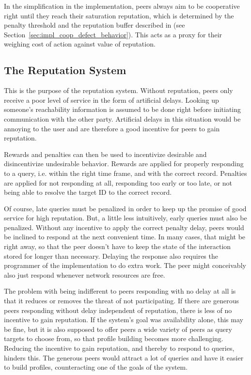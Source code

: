 In the simplification in the implementation, peers always aim to be cooperative
right until they reach their saturation reputation, which is determined by the
penalty threshold and the reputation buffer described in (see
Section~\ref{sec:impl_coop_defect_behavior}). This acts as a proxy for their
weighing cost of action against value of reputation.

\subsection{The Reputation System}
\label{sec:desc_rep_system}
This is the purpose of the reputation system. Without reputation, peers only
receive a poor level of service in the form of artificial delays. Looking up
someone's reachability information is assumed to be done right before initiating
communication with the other party. Artificial delays in this situation would be
annoying to the user and are therefore a good incentive for peers to gain
reputation.

Rewards and penalties can then be used to incentivize desirable and
disincentivize undesirable behavior. Rewards are applied for properly responding
to a query, i.e. within the right time frame, and with the correct record.
Penalties are applied for not responding at all, responding too early or too
late, or not being able to resolve the target ID to the correct record.

Of course, late queries must be penalized in order to keep up the promise
of good service for high reputation. But, a little less intuitively, early
queries must also be penalized. Without any incentive to apply the correct
penalty delay, peers would be inclined to respond at the next convenient time.
In many cases, that might be right away, so that the peer doesn't have to keep
the state of the interaction stored for longer than necessary. Delaying the
response also requires the programmer of the implementation to do extra work.
The peer might conceivably also just respond whenever network resources are
free.

The problem with being indifferent to peers responding with no delay at all is
that it reduces or removes the threat of not participating. If there are
generous peers responding without delay independent of reputation, there is less
of no incentive to gain reputation. If the system's goal was availability alone,
this may be fine, but it is also supposed to offer peers a wide variety of peers
as query targets to choose from, so that profile building becomes more
challenging. Reducing the incentive to gain reputation, and thereby to respond
to queries, hinders this. The generous peers would attract a lot of queries and
have it easier to build profiles, counteracting one of the goals of the system.

